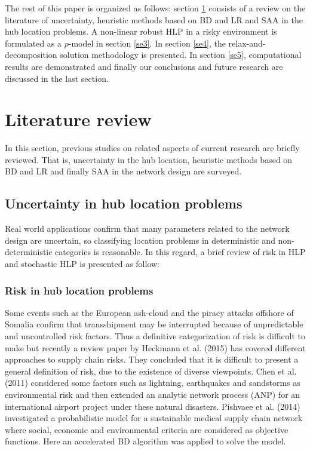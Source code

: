 \documentclass[review]{elsarticle}
\begin{document}
The rest of this paper is organized as follows: section \ref{se2} consists of a review on the literature of uncertainty, heuristic methods based on BD and LR and SAA in the hub location problems. A non-linear robust HLP in a risky environment is formulated as a $p$-model in section \ref{se3}. In section \ref{se4}, the relax-and-decomposition solution methodology is presented. In section \ref{se5}, computational results are demonstrated and finally our conclusions and future research are discussed in the last section.


\section{Literature review}\label{se2}

In this section, previous studies on related aspects of current research are briefly reviewed. That is, uncertainty in the hub location, heuristic methods based on BD and LR and finally SAA in the network design are surveyed.

\subsection{Uncertainty in hub location problems}

Real world applications confirm that many parameters related to the network design are uncertain, so classifying location problems in deterministic and non-deterministic categories is reasonable. In this regard, a brief review of risk in HLP and stochastic HLP is presented as follow:

\subsubsection{Risk in hub location problems}

Some events such as the European ash-cloud and the piracy attacks offshore of Somalia confirm that transshipment may be interrupted because of unpredictable and uncontrolled risk factors. Thus a definitive categorization of risk is difficult to make but recently a review paper by Heckmann et al. (2015) has covered different approaches to supply chain risks. They concluded that it is difficult to present a general definition of risk, due to the existence of diverse viewpoints. Chen et al. (2011) considered some factors such as lightning, earthquakes and sandstorms as environmental risk and then extended an analytic network process (ANP) for an international airport project under these natural disasters. Pishvaee et al. (2014) investigated a probabilistic model for a sustainable medical supply chain network where social, economic and environmental criteria are considered as objective functions. Here an accelerated BD algorithm was applied to solve the model.
\end{document}
